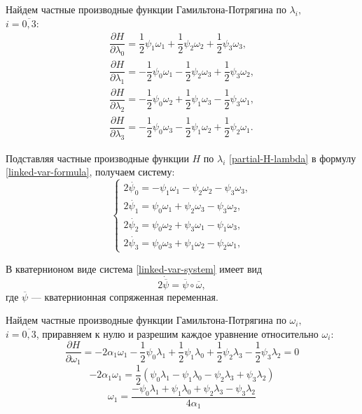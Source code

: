 \documentclass[14pt]{extreport}
\begin{document}
Найдем частные производные функции Гамильтона-Потрягина по $\lambda_i,$\\
$i=\overline{0,3}$:
\begin{equation}
\label{partial-H-lambda}
\begin{split}
\dfrac{\partial H}{\partial \lambda_0}=\dfrac{1}{2}\psi_1 \omega_1+\dfrac{1}{2}\psi_2 \omega_2 + \dfrac{1}{2} \psi_3 \omega_3,\\
\dfrac{\partial H}{\partial \lambda_1}=-\dfrac{1}{2}\psi_0 \omega_1-\dfrac{1}{2}\psi_2 \omega_3 + \dfrac{1}{2} \psi_3 \omega_2,\\
\dfrac{\partial H}{\partial \lambda_2}=-\dfrac{1}{2}\psi_0 \omega_2+\dfrac{1}{2}\psi_1 \omega_3 - \dfrac{1}{2} \psi_3 \omega_1,\\
\dfrac{\partial H}{\partial \lambda_3}=-\dfrac{1}{2}\psi_0 \omega_3-\dfrac{1}{2}\psi_1 \omega_2 + \dfrac{1}{2} \psi_2 \omega_1.
\end{split}
\end{equation}

Подставляя частные производные функции $H$ по $\lambda_i$ \eqref{partial-H-lambda} в формулу \eqref{linked-var-formula}, получаем систему:
\begin{equation}
\label{linked-var-system}
\begin{cases}
	2\dot{\psi_{0}} = -\psi_{1}\omega_{1} - \psi_{2}\omega_{2} - \psi_{3}\omega_{3},\\
	2\dot{\psi_{1}} = \psi_{0}\omega_{1} + \psi_{2}\omega_{3} - \psi_{3}\omega_{2},\\
	2\dot{\psi_{2}} = \psi_{0}\omega_{2} + \psi_{3}\omega_{1} - \psi_{1}\omega_{3},\\
	2\dot{\psi_{3}} = \psi_{0}\omega_{3} + \psi_{1}\omega_{2} - \psi_{2}\omega_{1},
\end{cases}
\end{equation}

В кватернионом виде система \eqref{linked-var-system} имеет вид
\begin{equation}
\label{linked-var-quaternion}
2\dot{\overline{\psi}} = \overline{\psi} \circ \overline{\omega},
\end{equation}
где $\overline{\psi}$ — кватернионная сопряженная переменная. 

Найдем частные производные функции Гамильтона-Потрягина по $\omega_i,$\\
$i=\overline{0,3}$, приравняем к нулю и разрешим каждое уравнение относительно $\omega_i$:
$$\dfrac{\partial H}{\partial \omega_1}=-2\alpha_1\omega_1-\dfrac{1}{2}\psi_0\lambda_1+\dfrac{1}{2}\psi_1\lambda_0+\dfrac{1}{2}\psi_2\lambda_3-\dfrac{1}{2}\psi_3\lambda_2=0$$
$$-2\alpha_1\omega_1=\dfrac{1}{2}(\psi_0\lambda_1-\psi_1\lambda_0-\psi_2\lambda_3+\psi_3\lambda_2)$$
$$\omega_1=\dfrac{-\psi_0\lambda_1+\psi_1\lambda_0+\psi_2\lambda_3-\psi_3\lambda_2}{4\alpha_1}$$
\end{document}
